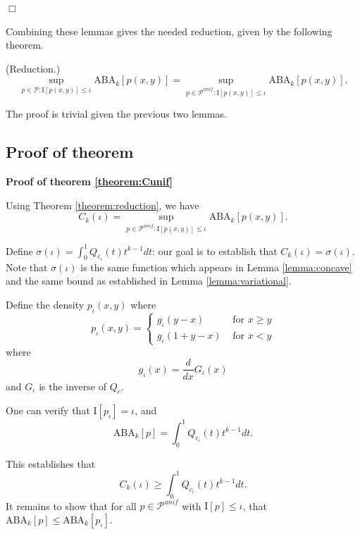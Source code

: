 $\Box$


Combining these lemmas gives the needed reduction, given by the following theorem.

\begin{theorem}\label{theorem:reduction} (Reduction.)
\[
\sup_{p \in \mathcal{P}: \text{I}[p(x,y)] \leq \iota} \text{ABA}_k[p(x,y)] = 
\sup_{p \in \mathcal{P}^{unif}: \text{I}[p(x,y)] \leq \iota} \text{ABA}_k[p(x,y)].
\]
\end{theorem}

The proof is trivial given the previous two lemmas.



\subsection{Proof of theorem}

\textbf{Proof of theorem \ref{theorem:Cunif}}

Using Theorem \ref{theorem:reduction}, we have
\[
C_k(\iota) = \sup_{p \in \mathcal{P}^{unif}: \text{I}[p(x,y)] \leq \iota} \text{ABA}_k[p(x,y)].
\]

Define $\sigma(\iota) = \int_0^1 Q_{c_\iota}(t) t^{k-1} dt$: our goal is to
establish that $C_k(\iota) = \sigma(\iota)$.  
Note that $\sigma(\iota)$
is the same function which appears in Lemma \ref{lemma:concave} and
the same bound as established in Lemma \ref{lemma:variational}.

Define the density $p_\iota(x, y)$ where
\[
p_\iota(x, y) = \begin{cases}
g_\iota(y - x) & \text{ for } x\geq y\\
g_\iota(1 + y - x) & \text{ for } x < y
\end{cases}
\]
where
\[
g_\iota(x) = \frac{d}{dx}G_\iota(x)
\]
and $G_\iota$ is the inverse of $Q_c$.

One can verify that $\text{I}[p_\iota] = \iota$, and 
\[
\text{ABA}_k[p] = \int_0^1 Q_{c_\iota}(t) t^{k-1} dt.
\]

This establishes that
\[
C_k(\iota) \geq \int_0^1 Q_{c_\iota}(t) t^{k-1} dt.
\]
It remains to show that for all $p \in \mathcal{P}^{unif}$ with
$\text{I}[p] \leq \iota$, that $\text{ABA}_k[p] \leq \text{ABA}_k[p_\iota]$.

